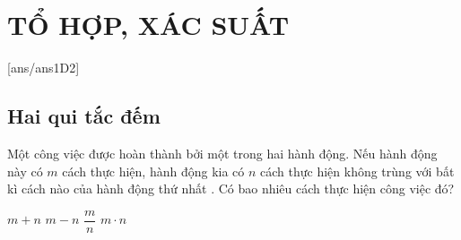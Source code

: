 \section{TỔ HỢP, XÁC SUẤT}
[ans/ans1D2]
\subsection{Hai qui tắc đếm}
\begin{ex} %
	Một công việc được hoàn thành bởi một trong hai hành động. Nếu hành động này có $ m  $ cách thực hiện, hành động kia có $ n $ cách thực hiện không trùng với bất kì cách nào của hành động thứ nhất . Có bao nhiêu cách thực hiện công việc đó?
	
	\choice
	{\True $ m+n $}
	{$ m-n $}
	{$ \dfrac{m}{n} $}
	{$ m\cdot n $}
\end{ex}

